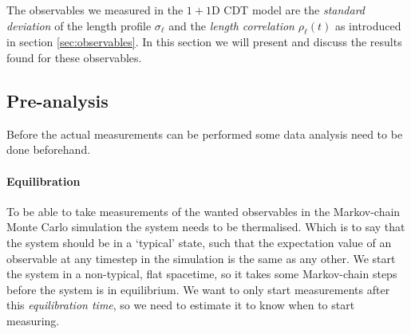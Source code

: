 The observables we measured in the $1 + 1$D CDT model are the \emph{standard deviation} of the length profile $\sigma_\ell$ and the \emph{length correlation} $\rho_\ell(t)$ as introduced in section \ref{sec:observables}.
In this section we will present and discuss the results found for these observables.

\subsection{Pre-analysis}
Before the actual measurements can be performed some data analysis need to be done beforehand.

\paragraph{Equilibration}
To be able to take measurements of the wanted observables in the Markov-chain Monte Carlo simulation the system needs to be thermalised. Which is to say that the system should be in a `typical' state, such that the expectation value of an observable at any timestep in the simulation is the same as any other.
We start the system in a non-typical, flat spacetime, so it takes some Markov-chain steps before the system is in equilibrium.
We want to only start measurements after this \emph{equilibration time}, so we need to estimate it to know when to start measuring.

